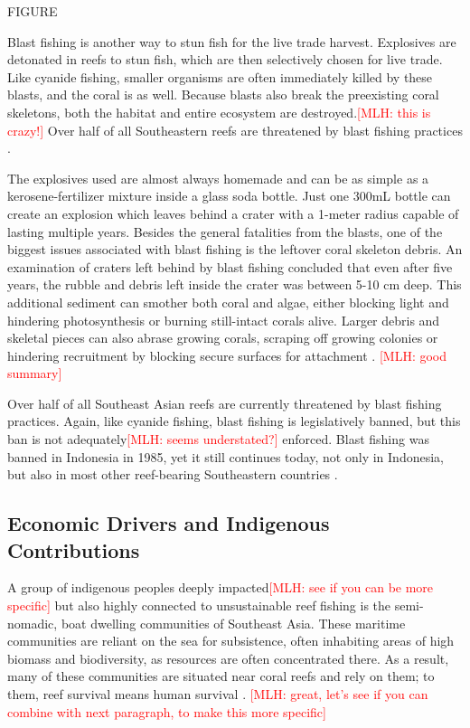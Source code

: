\documentclass{book}\usepackage{knitr}
\newcommand{\red}[1]{\textcolor{red}{[MLH: #1]}}
\begin{document}
{FIGURE

Blast fishing is another way to stun fish for the live trade harvest. Explosives are detonated in reefs to stun fish, which are then selectively chosen for live trade. Like cyanide fishing, smaller organisms are often immediately killed by these blasts, and the coral is as well. Because blasts also break the preexisting coral skeletons, both the habitat and entire ecosystem are destroyed.\red{this is crazy!}  Over half of all Southeastern reefs are threatened by blast fishing practices \citep{https://doi.org/10.1890/1051-0761(2006)016[1631:RFBFOC]2.0.CO;2}. 
  
The explosives used are almost always homemade and can be as simple as a kerosene-fertilizer mixture inside a glass soda bottle. Just one 300mL bottle can create an explosion which leaves behind a crater with a 1-meter radius capable of lasting multiple years. Besides the general fatalities from the blasts, one of the biggest issues associated with blast fishing is the leftover coral skeleton debris. An examination of craters left behind by blast fishing concluded that even after five years, the rubble and debris left inside the crater was between 5-10 cm deep. This additional sediment can smother both coral and algae, either blocking light and hindering photosynthesis or burning still-intact corals alive. Larger debris and skeletal pieces can also abrase growing corals, scraping off growing colonies or hindering recruitment by blocking secure surfaces for attachment \citep{https://doi.org/10.1890/1051-0761(2006)016[1631:RFBFOC]2.0.CO;2}. \red{good summary}

Over half of all Southeast Asian reefs are currently threatened by blast fishing practices. Again, like cyanide fishing, blast fishing is legislatively banned, but this ban is not adequately\red{seems understated?} enforced. Blast fishing was banned in Indonesia in 1985, yet it still continues today, not only in Indonesia, but also in most other reef-bearing Southeastern countries \citep{https://doi.org/10.1890/1051-0761(2006)016[1631:RFBFOC]2.0.CO;2}. 


\subsection{Economic Drivers and Indigenous Contributions}

A group of indigenous peoples deeply impacted\red{see if you can be more specific} but also highly connected to unsustainable reef fishing is the semi-nomadic, boat dwelling communities of Southeast Asia. These maritime communities are reliant on the sea for subsistence, often inhabiting areas of high biomass and biodiversity, as resources are often concentrated there. As a result, many of these communities are situated near coral reefs and rely on them; to them, reef survival means human survival \citep{boatpeople}. \red{great, let's see if you can combine with next paragraph, to make this more specific}

}
\end{document}
